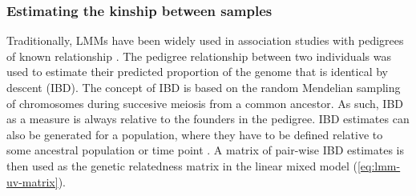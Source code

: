 \subsubsection{Estimating the kinship between samples}
 \label{subsubsection:grm}
Traditionally, LMMs have been widely used in association studies with pedigrees of known relationship \citep{Eu-ahsunthornwattana2014}. The pedigree relationship between two individuals was used to estimate their predicted proportion of the genome that is identical by descent (IBD). The concept of IBD  is based on the random Mendelian sampling of chromosomes during succesive meiosis from a common ancestor. As such, IBD as a measure is always relative to the founders in the pedigree. IBD estimates can also be generated for a population, where they have to be defined relative to some ancestral population or time point \citep{Browning2010,Glazner2012}. A matrix of pair-wise IBD estimates is then used as the genetic relatedness matrix  in the linear mixed model (\cref{eq:lmm-uv-matrix}).

